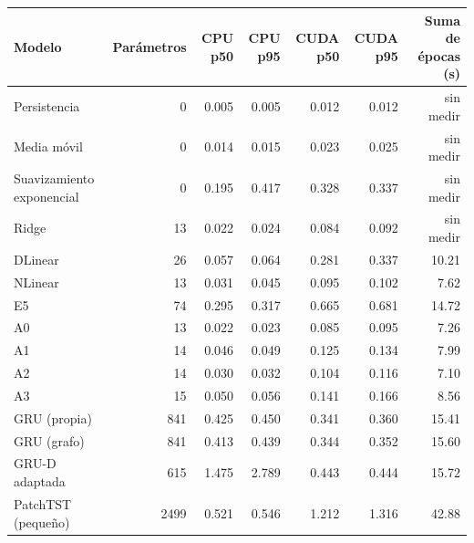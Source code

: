 \begin{tabular}{lrrrrrr}
\toprule
Modelo & Parámetros & CPU p50 & CPU p95 & CUDA p50 & CUDA p95 & Suma de épocas (s) \\
\midrule
Persistencia & 0 & 0.005 & 0.005 & 0.012 & 0.012 & sin medir \\
Media móvil & 0 & 0.014 & 0.015 & 0.023 & 0.025 & sin medir \\
Suavizamiento exponencial & 0 & 0.195 & 0.417 & 0.328 & 0.337 & sin medir \\
Ridge & 13 & 0.022 & 0.024 & 0.084 & 0.092 & sin medir \\
DLinear & 26 & 0.057 & 0.064 & 0.281 & 0.337 & 10.21 \\
NLinear & 13 & 0.031 & 0.045 & 0.095 & 0.102 & 7.62 \\
E5 & 74 & 0.295 & 0.317 & 0.665 & 0.681 & 14.72 \\
A0 & 13 & 0.022 & 0.023 & 0.085 & 0.095 & 7.26 \\
A1 & 14 & 0.046 & 0.049 & 0.125 & 0.134 & 7.99 \\
A2 & 14 & 0.030 & 0.032 & 0.104 & 0.116 & 7.10 \\
A3 & 15 & 0.050 & 0.056 & 0.141 & 0.166 & 8.56 \\
GRU (propia) & 841 & 0.425 & 0.450 & 0.341 & 0.360 & 15.41 \\
GRU (grafo) & 841 & 0.413 & 0.439 & 0.344 & 0.352 & 15.60 \\
GRU-D adaptada & 615 & 1.475 & 2.789 & 0.443 & 0.444 & 15.72 \\
PatchTST (pequeño) & 2499 & 0.521 & 0.546 & 1.212 & 1.316 & 42.88 \\
\bottomrule
\end{tabular}
